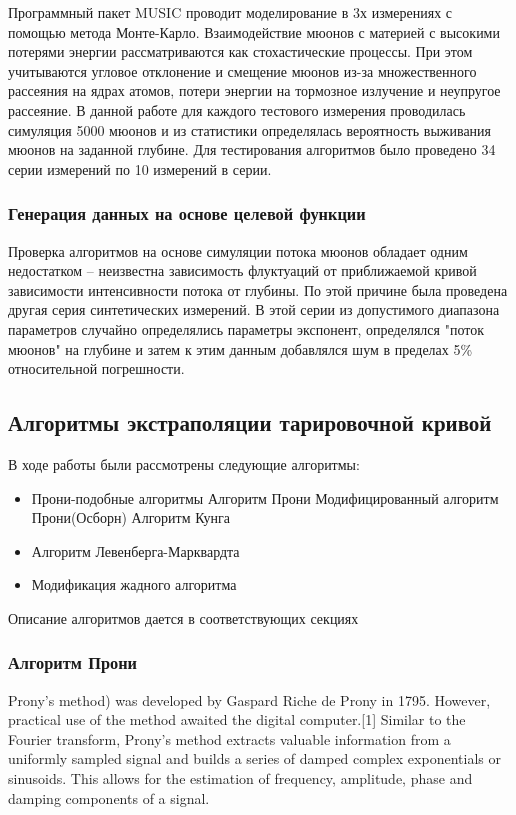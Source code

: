 \documentclass[a4paper,10pt]{article}
\begin{document}
Программный пакет MUSIC проводит моделирование в 3х измерениях с помощью метода Монте-Карло. Взаимодействие мюонов с материей с высокими потерями энергии рассматриваются 
как стохастические процессы. При этом учитываются угловое отклонение и смещение мюонов из-за множественного рассеяния на ядрах атомов, потери энергии на тормозное излучение
и неупругое рассеяние. В данной работе для каждого тестового измерения проводилась симуляция 5000 мюонов и из статистики определялась вероятность выживания мюонов на заданной глубине. 
Для тестирования алгоритмов было проведено 34 серии измерений по 10 измерений в серии. 


\subsubsection{Генерация данных на основе целевой функции}


Проверка алгоритмов на основе симуляции потока мюонов обладает одним недостатком -- неизвестна зависимость флуктуаций от приближаемой кривой зависимости интенсивности 
потока от глубины. По этой причине была проведена другая серия синтетических измерений. В этой серии из допустимого диапазона параметров случайно определялись параметры 
экспонент, определялся "поток мюонов" на глубине и затем к этим данным добавлялся шум в пределах 5\% относительной погрешности.



\subsection{Алгоритмы экстраполяции тарировочной кривой}

В ходе работы были рассмотрены следующие алгоритмы:

\begin{itemize}
 \item Прони-подобные алгоритмы
 \subitem Алгоритм Прони
 \subitem Модифицированный алгоритм Прони(Осборн)
 \subitem Алгоритм Кунга
 \item Алгоритм Левенберга-Марквардта
 \item Модификация жадного алгоритма
 
\end{itemize}

Описание алгоритмов дается в соответствующих секциях

\subsubsection{Алгоритм Прони}
Prony's method) was developed by Gaspard Riche de Prony in 1795. However, practical use of the method 
awaited the digital computer.[1] Similar to the Fourier transform, Prony's method extracts valuable information
from a uniformly sampled signal and builds a series of damped complex exponentials or sinusoids. This allows for 
the estimation of frequency, amplitude, phase and damping components of a signal.
\end{document}
